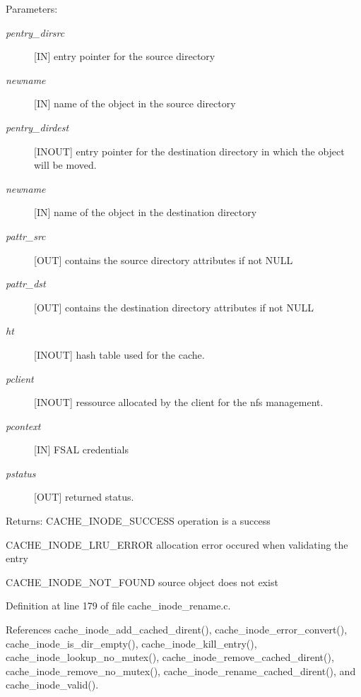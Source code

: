 \begin{Desc}
\item[Parameters:]
\begin{description}
\item[{\em pentry\_\-dirsrc}][IN] entry pointer for the source directory \item[{\em newname}][IN] name of the object in the source directory \item[{\em pentry\_\-dirdest}][INOUT] entry pointer for the destination directory in which the object will be moved. \item[{\em newname}][IN] name of the object in the destination directory \item[{\em pattr\_\-src}][OUT] contains the source directory attributes if not NULL \item[{\em pattr\_\-dst}][OUT] contains the destination directory attributes if not NULL \item[{\em ht}][INOUT] hash table used for the cache. \item[{\em pclient}][INOUT] ressource allocated by the client for the nfs management. \item[{\em pcontext}][IN] FSAL credentials \item[{\em pstatus}][OUT] returned status.\end{description}
\end{Desc}
\begin{Desc}
\item[Returns:]CACHE\_\-INODE\_\-SUCCESS operation is a success \par
 

CACHE\_\-INODE\_\-LRU\_\-ERROR allocation error occured when validating the entry\par
 

CACHE\_\-INODE\_\-NOT\_\-FOUND source object does not exist \end{Desc}


Definition at line 179 of file cache\_\-inode\_\-rename.c.

References cache\_\-inode\_\-add\_\-cached\_\-dirent(), cache\_\-inode\_\-error\_\-convert(), cache\_\-inode\_\-is\_\-dir\_\-empty(), cache\_\-inode\_\-kill\_\-entry(), cache\_\-inode\_\-lookup\_\-no\_\-mutex(), cache\_\-inode\_\-remove\_\-cached\_\-dirent(), cache\_\-inode\_\-remove\_\-no\_\-mutex(), cache\_\-inode\_\-rename\_\-cached\_\-dirent(), and cache\_\-inode\_\-valid().
